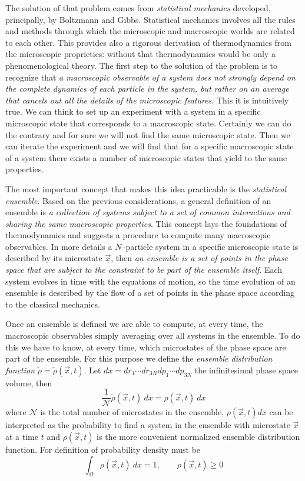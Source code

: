 The solution of that problem comes from \textit{statistical mechanics} developed, principally, by Boltzmann and
Gibbs. Statistical mechanics involves all the rules and methods through which the microscopic and macroscopic
worlds are related to each other. This provides also a rigorous derivation of thermodynamics from the microscopic
proprieties: without that thermodynamics would be only a phenomenological theory. The first step to the solution
of the problem is to recognize that \textit{a macroscopic observable of a system does not strongly depend on the
complete dynamics of each particle in the system, but rather on an average that cancels out all the details of
the microscopic features}. This it is intuitively true. We can think to set up an experiment with a system in a
specific microscopic state that corresponds to a macroscopic state. Certainly we can do the contrary and for sure
we will not find the same microscopic state. Then we can iterate the experiment and we will find that for a
specific macroscopic state of a system there exists a number of microscopic states that yield to the same
properties.

The most important concept that makes this idea practicable is the \textit{statistical ensemble}. Based on the
previous considerations, a general definition of an ensemble is \textit{a collection of systems subject to a set
of common interactions and sharing the same macroscopic properties}. This concept lays the foundations of
thermodynamics and suggests a procedure to compute many macroscopic observables. In more details a
$N$--particle system in a specific microscopic state is described by its microstate $\vec x$, then \textit{an
ensemble is a set of points in the phase space that are subject to the constraint to be part of the ensemble
itself}. Each system evolves in time with the equations of motion, so the time evolution of an ensemble is
described by the flow of a set of points in the phase space according to the classical mechanics.

Once an ensemble is defined we are able to compute, at every time, the macroscopic observables simply averaging
over all systems in the ensemble. To do this we have to know, at every time, which microstates of the phase space
are part of the ensemble. For this purpose we define the \textit{ensemble distribution function}
$\tilde\rho = \tilde\rho(\vec x,t)$. Let $dx = dr_1\cdots dr_{3N} dp_1 \cdots dp_{3N}$ the infinitesimal phase
space volume, then
\begin{equation*}
	\frac{1}{\mathcal{N}}\tilde\rho(\vec x, t)\ dx = \rho(\vec x, t)\ dx
\end{equation*}
where $\mathcal{N}$ is the total number of microstates in the ensemble, $\rho(\vec x, t)dx$ can be interpreted as
the probability to find a system in the ensemble with microstate $\vec x$ at a time $t$ and $\rho(\vec x, t)$ is
the more convenient normalized ensemble distribution function. For definition of probability density must be
\begin{equation*}
	\int_{\Omega} \rho(\vec x, t)\ dx = 1, \qquad \rho(\vec x, t) \ge 0
\end{equation*}

